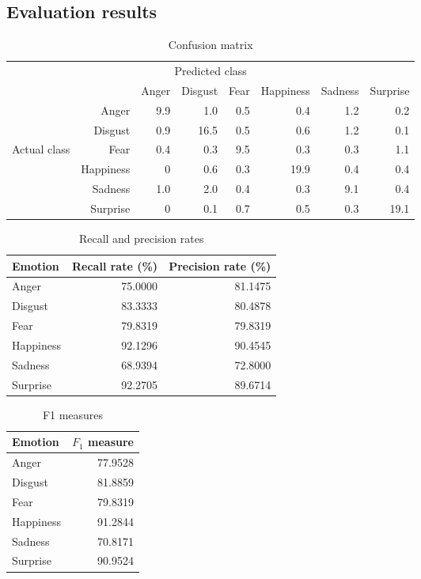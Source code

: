 \documentclass[12pt]{article}
\begin{document}
\subsection*{Evaluation results}

\begin{table}
\centering
\begin{tabular}{r r | r r r r r r}
\multicolumn{8}{c}{Predicted class} \\
&  & Anger & Disgust & Fear & Happiness & Sadness & Surprise \\
\hline
 & Anger            & 9.9 & 1.0  & 0.5 & 0.4  & 1.2 & 0.2  \\
 & Disgust          & 0.9 & 16.5 & 0.5 & 0.6  & 1.2 & 0.1  \\
Actual class & Fear & 0.4 & 0.3  & 9.5 & 0.3  & 0.3 & 1.1  \\
 & Happiness        & 0   & 0.6  & 0.3 & 19.9 & 0.4 & 0.4  \\
 & Sadness          & 1.0 & 2.0  & 0.4 & 0.3  & 9.1 & 0.4  \\
 & Surprise         & 0   & 0.1  & 0.7 & 0.5  & 0.3 & 19.1 \\
\end{tabular}
\caption{Confusion matrix}
\end{table}

\begin{table}
\centering
\begin{tabular}{l | r r}
Emotion & Recall rate (\%) & Precision rate (\%) \\
\hline
Anger     & 75.0000 & 81.1475 \\
Disgust   & 83.3333 & 80.4878 \\
Fear      & 79.8319 & 79.8319 \\
Happiness & 92.1296 & 90.4545 \\
Sadness   & 68.9394 & 72.8000 \\
Surprise  & 92.2705 & 89.6714 \\
\end{tabular}
\caption{Recall and precision rates}
\end{table}

\begin{table}
\centering
\begin{tabular}{l | r}
Emotion & \( F_1 \) measure \\
\hline
Anger     & 77.9528 \\
Disgust   & 81.8859 \\
Fear      & 79.8319 \\
Happiness & 91.2844 \\
Sadness   & 70.8171 \\
Surprise  & 90.9524 \\
\end{tabular}
\caption{F1 measures}
\end{table}
\end{document}
